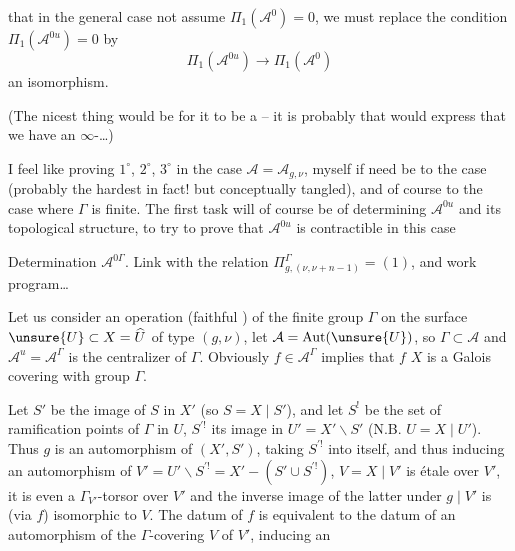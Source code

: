 
 that in the general case  not assume $\Pi_1(\mathcal A^0)=0$, we must replace the condition $\Pi_1(\mathcal A^{0u})=0$ by
\[
\Pi_1(\mathcal A^{0u})\longrightarrow\Pi_1(\mathcal A^0)
\]
an isomorphism.


(The nicest thing would be for it to be a  -- it is  probably that would express that we have an $\infty$-\ldots)

I feel like proving  $1^\circ$, $2^\circ$, $3^\circ$ in the case $\mathcal A=\mathcal A_{g,\nu}$,  myself if need be to the  case (probably the hardest in fact! \unsure{\}} but   conceptually tangled), and of course to the case where $\Gamma$ is finite. The first task will of course be  of determining $\mathcal A^{0u}$ and its topological structure, to try to prove that $\mathcal A^{0u}$ is contractible in this case


  Determination  $\mathcal A^{0\Gamma}$. Link with the relation $\Pi_{g,(\nu,\nu+n-1)}^\Gamma=(1)$, and work program\ldots

Let us consider an operation (faithful ) of the finite group $\Gamma$ on the surface $\unsure{U}\subset X=\widehat U$ of type $(g,\nu)$,  let $\mathcal A=\operatorname{Aut}(\unsure{U})$, so $\Gamma\subset\mathcal A$ and $\mathcal A^{u}=\mathcal A^\Gamma$ is the centralizer of $\Gamma$.  Obviously $f\in\mathcal A^\Gamma$ implies that $f$    $X$ is a Galois covering with group $\Gamma$.

Let $S'$ be the image of $S$ in $X'$ (so $S=X\mid S'$), and let $S^!$ be the set of ramification points of $\Gamma$ in $U$, $S^{\prime!}$ its image in $U'=X'\backslash S'$ (N.B. $U=X\mid U'$). Thus $g$ is an automorphism of $(X',S')$, taking $S^{\prime!}$ into itself, and  thus inducing an automorphism of $V'=U'\backslash S^{\prime!}=X'-(S'\cup S^{\prime!})$,     $V=X\mid V'$ is étale over $V'$, it is even a $\Gamma_{V'}$-torsor over $V'$ and the inverse image of the latter under $g\mid V'$ is (via $f$) isomorphic to $V$. The datum of $f$ is equivalent to the datum of an automorphism of the  $\Gamma$-covering $V$ of $V'$, inducing an

